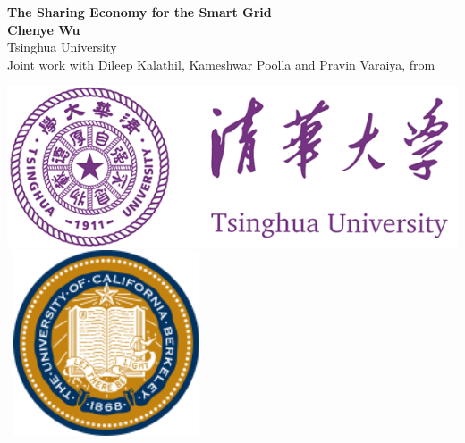 \documentclass[a0,portrait]{a0poster}
\begin{document}
\pagecolor{Lavender}



\begin{minipage}[b]{0.7\linewidth}
\Huge \color{NavyBlue} \textbf{The Sharing Economy for the Smart Grid} \color{Black}\\[1cm] %
\huge \textbf{Chenye Wu}\\[0.5cm] %
\huge Tsinghua University\\[0.4cm] %
\Large Joint work with  Dileep Kalathil, Kameshwar Poolla and Pravin Varaiya, from \\
\end{minipage}
%
\begin{minipage}[b]{0.3\linewidth}
\includegraphics[width=16cm]{logo.png} \
\includegraphics[width=5.5cm]{logo-UCB.png}\\
\end{minipage}
\end{document}
